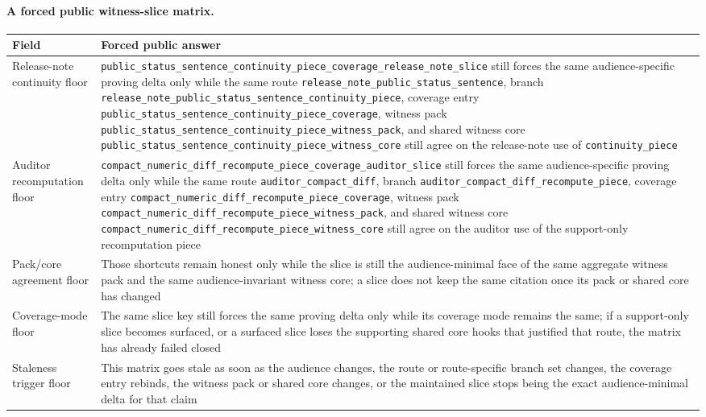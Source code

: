 \documentclass[11pt]{article}
\begin{document}
\paragraph{A forced public witness-slice matrix.}
\begin{table}[t]
\centering
\small
\begin{tabularx}{\linewidth}{@{}lX@{}}
\toprule
Field & Forced public answer \\
\midrule
Release-note continuity floor & \nolinkurl{public_status_sentence_continuity_piece_coverage_release_note_slice} still forces the same audience-specific proving delta only while the same route \nolinkurl{release_note_public_status_sentence}, branch \nolinkurl{release_note_public_status_sentence_continuity_piece}, coverage entry \nolinkurl{public_status_sentence_continuity_piece_coverage}, witness pack \nolinkurl{public_status_sentence_continuity_piece_witness_pack}, and shared witness core \nolinkurl{public_status_sentence_continuity_piece_witness_core} still agree on the release-note use of \nolinkurl{continuity_piece} \\
Auditor recomputation floor & \nolinkurl{compact_numeric_diff_recompute_piece_coverage_auditor_slice} still forces the same audience-specific proving delta only while the same route \nolinkurl{auditor_compact_diff}, branch \nolinkurl{auditor_compact_diff_recompute_piece}, coverage entry \nolinkurl{compact_numeric_diff_recompute_piece_coverage}, witness pack \nolinkurl{compact_numeric_diff_recompute_piece_witness_pack}, and shared witness core \nolinkurl{compact_numeric_diff_recompute_piece_witness_core} still agree on the auditor use of the support-only recomputation piece \\
Pack/core agreement floor & Those shortcuts remain honest only while the slice is still the audience-minimal face of the same aggregate witness pack and the same audience-invariant witness core; a slice does not keep the same citation once its pack or shared core has changed \\
Coverage-mode floor & The same slice key still forces the same proving delta only while its coverage mode remains the same; if a support-only slice becomes surfaced, or a surfaced slice loses the supporting shared core hooks that justified that route, the matrix has already failed closed \\
Staleness trigger floor & This matrix goes stale as soon as the audience changes, the route or route-specific branch set changes, the coverage entry rebinds, the witness pack or shared core changes, or the maintained slice stops being the exact audience-minimal delta for that claim \\

\end{tabularx}
\end{table}
\end{document}
